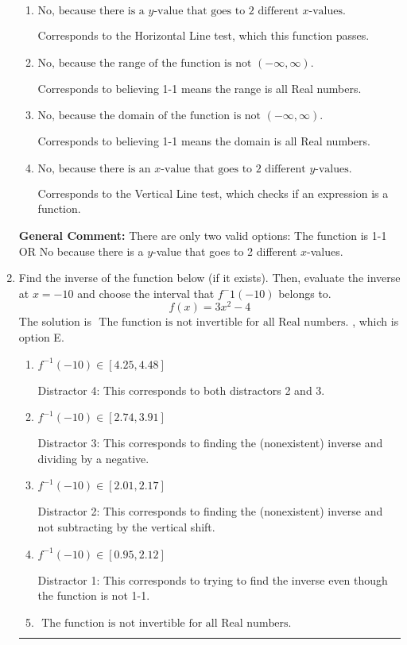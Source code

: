 \documentclass{extbook}[14pt]
\newcommand{\litem}[1]{\item #1

\rule{\textwidth}{0.4pt}}
\begin{document}
\begin{enumerate}
{\begin{enumerate}[label=\Alph*.]
* This is the solution.
\item \( \text{No, because there is a $y$-value that goes to 2 different $x$-values.} \)

Corresponds to the Horizontal Line test, which this function passes.
\item \( \text{No, because the range of the function is not $(-\infty, \infty)$.} \)

Corresponds to believing 1-1 means the range is all Real numbers.
\item \( \text{No, because the domain of the function is not $(-\infty, \infty)$.} \)

Corresponds to believing 1-1 means the domain is all Real numbers.
\item \( \text{No, because there is an $x$-value that goes to 2 different $y$-values.} \)

Corresponds to the Vertical Line test, which checks if an expression is a function.
\end{enumerate}

\textbf{General Comment:} There are only two valid options: The function is 1-1 OR No because there is a $y$-value that goes to 2 different $x$-values.
}
\litem{
Find the inverse of the function below (if it exists). Then, evaluate the inverse at $x = -10$ and choose the interval that $f^-1(-10)$ belongs to.
\[ f(x) = 3 x^2 - 4 \]The solution is \( \text{ The function is not invertible for all Real numbers. } \), which is option E.\begin{enumerate}[label=\Alph*.]
\item \( f^{-1}(-10) \in [4.25, 4.48] \)

 Distractor 4: This corresponds to both distractors 2 and 3.
\item \( f^{-1}(-10) \in [2.74, 3.91] \)

 Distractor 3: This corresponds to finding the (nonexistent) inverse and dividing by a negative.
\item \( f^{-1}(-10) \in [2.01, 2.17] \)

 Distractor 2: This corresponds to finding the (nonexistent) inverse and not subtracting by the vertical shift.
\item \( f^{-1}(-10) \in [0.95, 2.12] \)

 Distractor 1: This corresponds to trying to find the inverse even though the function is not 1-1. 
\item \( \text{ The function is not invertible for all Real numbers. } \)


\end{enumerate}}
\end{enumerate}
\end{document}
